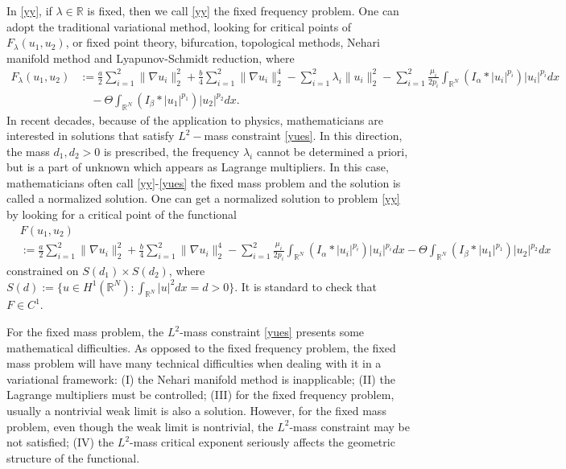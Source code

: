 \documentclass[reqno]{amsart}
\begin{document}
In \eqref{yy}, if $\lambda\in\mathbb{R}$ is fixed, then we call \eqref{yy} the fixed
frequency problem. One can adopt the traditional variational method,
looking for critical points of $F_\lambda(u_1,u_2)$, or fixed point theory,
bifurcation, topological methods, Nehari manifold method and Lyapunov-Schmidt reduction,
where
\begin{align*}
F_\lambda(u_1,u_2)
&:=\frac{a}{2}\sum_{i=1}^2\| \nabla u_i\|_2^2
 +\frac{b}{4}\sum_{i=1}^2\| \nabla u_i\|_2^4-\sum_{i=1}^2\lambda_i\| u_i\|_2^2
 -\sum_{i=1}^2\frac{\mu_i}{2p_i}\int_{\mathbb{R}^N}
 (I_\alpha\ast|u_i|^{p_i})|u_i|^{p_i}dx\\
&\quad -\Theta\int_{\mathbb{R}^N}(I_\beta\ast|u_1|^{p_1})|u_2|^{p_2}dx.
\end{align*}
In recent decades, because of the application to physics, mathematicians are
interested in solutions that satisfy $L^2-$mass constraint \eqref{yues}.
In this direction, the mass $d_1,d_2>0$ is prescribed, the frequency $\lambda_i$
cannot be determined a priori, but is a part of unknown which appears as Lagrange
multipliers.
In this case, mathematicians often call \eqref{yy}-\eqref{yues} the fixed mass
problem and the solution is called a normalized solution.
One can get a normalized solution to problem \eqref{yy} by looking for a critical
point of the  functional
\begin{align*}
&F(u_1,u_2) \\
&:=\frac{a}{2}\sum_{i=1}^2\| \nabla u_i\|_2^2
 +\frac{b}{4}\sum_{i=1}^2\| \nabla u_i\|_2^4-
\sum_{i=1}^2\frac{\mu_i}{2p_i}\int_{\mathbb{R}^N}(I_\alpha\ast|u_i|^{p_i})|u_i|^{p_i}dx
-\Theta\int_{\mathbb{R}^N}(I_\beta\ast|u_1|^{p_1})|u_2|^{p_2}dx
\end{align*}
constrained on $S(d_1)\times S(d_2)$, where
$S(d):=\{u\in H^1(\mathbb{R}^N): \int_{\mathbb{R}^N}|u|^2dx=d>0\}$.
It is standard to check that $F\in C^1$.

For the fixed mass problem, the $L^2$-mass constraint \eqref{yues} presents some
mathematical difficulties. As opposed to the fixed
frequency problem, the fixed mass problem will have many technical difficulties when
dealing with it in a variational framework:
(I) the Nehari manifold method is inapplicable;
(II) the Lagrange multipliers must be controlled;
(III) for the fixed frequency problem, usually a
nontrivial weak limit is also a solution.
However, for the fixed mass problem, even though the weak limit is nontrivial, the
$L^2$-mass constraint may be not satisfied;
(IV) the $L^2$-mass critical exponent seriously affects the geometric structure of the
functional.
\end{document}
